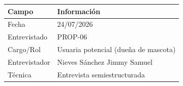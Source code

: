 \documentclass[journal,onecolumn]{IEEEtran}
\begin{document}
	\begin{table}[H]
		\centering\small
		\begin{tabularx}{\textwidth}{@{}l X@{}}
			\toprule
			\textbf{Campo} & \textbf{Información} \\
			\midrule
			
			Fecha & 24/07/2026 \\
			
			Entrevistado & PROP-06 \\
			
			Cargo/Rol & Usuaria potencial (dueña de mascota) \\
			
			Entrevistador & Nieves Sánchez Jimmy Samuel \\
			
			Técnica & Entrevista semiestructurada \\
			
			\bottomrule
		\end{tabularx}
	\end{table}
	
\end{document}
